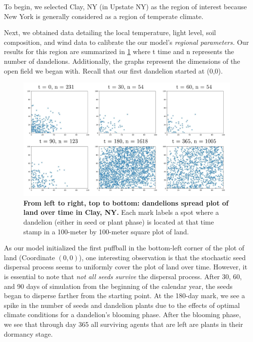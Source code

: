 To begin, we selected Clay, NY (in Upstate NY) as the region of interest because New York is generally considered as a region of temperate climate.

Next, we obtained data detailing the local temperature, light level, soil composition, and wind data to calibrate the our model's \textit{regional parameters.} Our results for this region are summarized in \ref{fig:temperatespread} where t  time and n represents the number of dandelions. Additionally, the graphs represent the dimensions of the open field we began with. Recall that our first dandelion started at (0,0).

\begin{figure}[h!]
\centering
    \includegraphics[scale=0.5]{figures/moderateclimatespread.pdf}
    \captionsetup{width=0.9\textwidth}
    \caption{\textbf{From left to right, top to bottom: dandelions spread plot of land over time in Clay, NY.} Each mark labels a spot where a dandelion (either in seed or plant phase) is located at that time stamp in a 100-meter by 100-meter square plot of land.}
    \label{fig:temperatespread}
\end{figure}

As our model initialized the first puffball in the bottom-left corner of the plot of land (Coordinate \((0, 0)\)), one interesting observation is that the stochastic seed dispersal process seems to uniformly cover the plot of land over time. However, it is essential to note that \textit{not all seeds survive} the dispersal process. After 30, 60, and 90 days of simulation from the beginning of the calendar year, the seeds began to disperse farther from the starting point. At the 180-day mark, we see a spike in the number of seeds and dandelion plants due to the effects of optimal climate conditions for a dandelion's blooming phase. After the blooming phase, we see that through day 365 all surviving agents that are left are plants in their dormancy stage.

